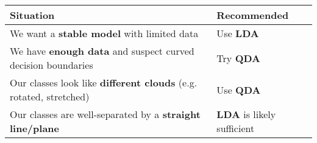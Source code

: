 \begin{table}[!htp]
    \centering
    \begin{adjustbox}{width={\textwidth},totalheight={\textheight},keepaspectratio}
        \begin{tabular}{@{} l l @{}}
            \toprule
            Situation & Recommended \\
            \midrule
            We want a \textbf{stable model} with limited data                           & Use \textbf{LDA}                  \\ [.5em]
            We have \textbf{enough data} and suspect curved decision boundaries         & Try \textbf{QDA}                  \\ [.5em]
            Our classes look like \textbf{different clouds} (e.g. rotated, stretched)   & Use \textbf{QDA}                  \\ [.5em]
            Our classes are well-separated by a \textbf{straight line/plane}            & \textbf{LDA} is likely sufficient \\
            \bottomrule
        \end{tabular}
    \end{adjustbox}
\end{table}